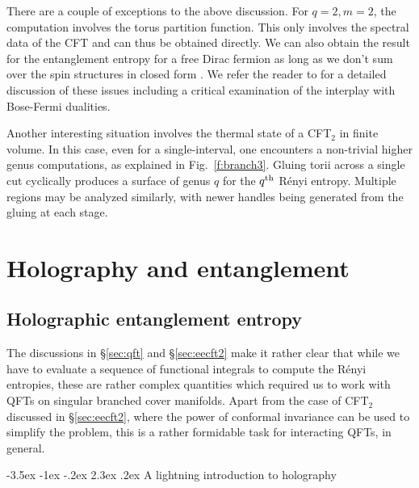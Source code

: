 \documentclass[12pt,openany]{book}
\makeatletter
\renewcommand\section{\@startsection {section}{1}{\z@}%
                                   {-3.5ex \@plus -1ex \@minus -.2ex}%
                                   {2.3ex \@plus.2ex}%
                                   {\normalfont\large\bfseries}}
\makeatother
\begin{document}
There are a couple of exceptions to the above discussion. For $q=2, m =2$, the computation involves the torus partition function. This only involves the spectral data of the CFT and can thus be obtained directly. We can also obtain the result for the entanglement entropy for a free Dirac fermion as long as we don't sum over the spin structures in closed form \cite{Casini:2008wt}. We refer the reader to \cite{Headrick:2012fk} for a detailed discussion of these issues including a critical examination of the interplay with Bose-Fermi dualities.

Another interesting situation involves the thermal state of a CFT$_2$ in finite volume. In this case, even for a single-interval, one encounters a non-trivial higher genus computations, as explained in Fig.~\ref{f:branch3}.
Gluing torii across a single cut cyclically produces a surface of genus $q$ for the $q^{\rm th}$ R\'enyi entropy. Multiple regions may be analyzed similarly, with newer handles being generated from the gluing at each stage.

\newpage
\part{Holography and entanglement}
\label{part:hee}


\chapter{Holographic entanglement entropy}
\label{sec:hee}

The discussions in \S\ref{sec:qft} and \S\ref{sec:eecft2} make it rather clear that while we have to evaluate a sequence of functional integrals to compute the R\'enyi entropies, these are rather complex quantities which required us to work with QFTs on singular branched cover manifolds.  Apart from the case of CFT$_2$ discussed in \S\ref{sec:eecft2},  where the power of conformal invariance can be used to simplify the problem, this is a rather formidable task  for interacting QFTs, in general.

\section{A lightning introduction to holography}
\label{sec:adscft}
\end{document}
